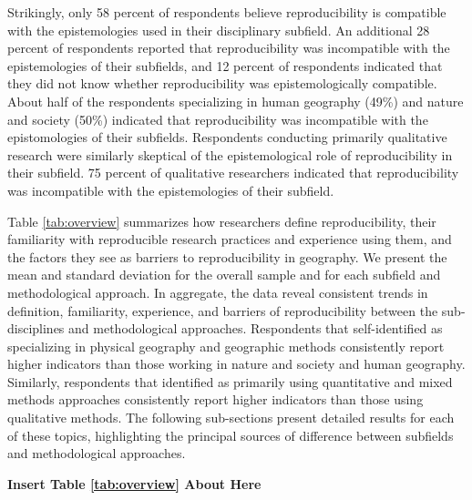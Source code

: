\documentclass[]{interact}
\theoremstyle{plain}%
\theoremstyle{definition}
\theoremstyle{remark}
\begin{document}
Strikingly, only 58 percent of respondents believe reproducibility is compatible with the epistemologies used in their disciplinary subfield.
An additional 28 percent of respondents reported that reproducibility was incompatible with the epistemologies of their subfields, and  12 percent of respondents indicated that they did not know whether reproducibility was epistemologically compatible. 
About half of the respondents specializing in human geography (49\%) and nature and society (50\%) indicated that reproducibility was incompatible with the epistomologies of their subfields. 
Respondents conducting primarily qualitative research were similarly skeptical of the epistemological role of reproducibility in their subfield.
75 percent of qualitative researchers indicated that reproducibility was incompatible with the epistemologies of their subfield.

Table \ref{tab:overview} summarizes how researchers define reproducibility, their familiarity with reproducible research practices and experience using them, and the factors they see as barriers to reproducibility in geography. 
We present the mean and standard deviation for the overall sample and for each subfield and methodological approach.
In aggregate, the data reveal consistent trends in definition, familiarity, experience, and barriers of reproducibility between the sub-disciplines and methodological approaches. 
Respondents that self-identified as specializing in physical geography and geographic methods consistently report higher indicators than those working in nature and society and human geography.
Similarly, respondents that identified as primarily using quantitative and mixed methods approaches consistently report higher indicators than those using qualitative methods.
The following sub-sections present detailed results for each of these topics, highlighting the principal sources of difference between subfields and methodological approaches.

\begin{center}
\textbf{Insert Table \ref{tab:overview} About Here}
\end{center}


\end{document}
